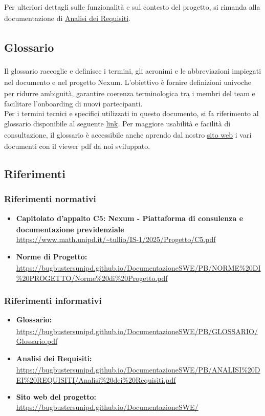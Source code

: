 \documentclass[a4paper,11pt]{article}
\newcommand{\G}{\textsubscript{\scalebox{0.6}{\textbf{G}}}}
\begin{document}
Per ulteriori dettagli sulle funzionalità\G{} e sul contesto del progetto\G{}, si rimanda alla documentazione di \href{https://bugbustersunipd.github.io/DocumentazioneSWE/PB/ANALISI%20DEI%20REQUISITI/Analisi%20dei%20Requisiti.pdf}{Analisi dei Requisiti\G{}}.


\subsection{Glossario\G{}}
Il glossario\G{} raccoglie e definisce i termini, gli acronimi e le abbreviazioni 
impiegati nel documento e nel progetto\G{} Nexum. L'obiettivo è fornire definizioni univoche per ridurre 
ambiguità, garantire coerenza terminologica tra i membri del team e facilitare l'onboarding di nuovi partecipanti. \\
Per i termini tecnici e specifici utilizzati in questo documento, si fa riferimento al glossario\G{} disponibile al 
seguente \href{https://bugbustersunipd.github.io/DocumentazioneSWE/PB/GLOSSARIO/Glossario.pdf}{link}.
Per maggiore usabilità e facilità di consultazione, il glossario\G{} è accessibile anche aprendo dal nostro \href{https://bugbustersunipd.github.io/DocumentazioneSWE/}{sito web} i vari documenti con il viewer
pdf da noi sviluppato.
 
\subsection{Riferimenti}
 
\subsubsection{Riferimenti normativi}
\begin{itemize}
\item \textbf{Capitolato\G{}
 d'appalto C5: Nexum - Piattaforma di consulenza e documentazione previdenziale}\\
\url{https://www.math.unipd.it/~tullio/IS-1/2025/Progetto/C5.pdf}
\item \textbf{Norme di Progetto\G{}:}\\
\url{https://bugbustersunipd.github.io/DocumentazioneSWE/PB/NORME%20DI%20PROGETTO/Norme%20di%20Progetto.pdf}
\end{itemize}
 
\subsubsection{Riferimenti informativi}
\begin{itemize}
    \item \textbf{Glossario\G{}:}\\
\url{https://bugbustersunipd.github.io/DocumentazioneSWE/PB/GLOSSARIO/Glossario.pdf}
    \item \textbf{Analisi dei Requisiti\G{}:}\\
\url{https://bugbustersunipd.github.io/DocumentazioneSWE/PB/ANALISI%20DEI%20REQUISITI/Analisi%20dei%20Requisiti.pdf}
    \item \textbf{Sito web del progetto:}\\
\url{https://bugbustersunipd.github.io/DocumentazioneSWE/}
\end{itemize}
\end{document}
